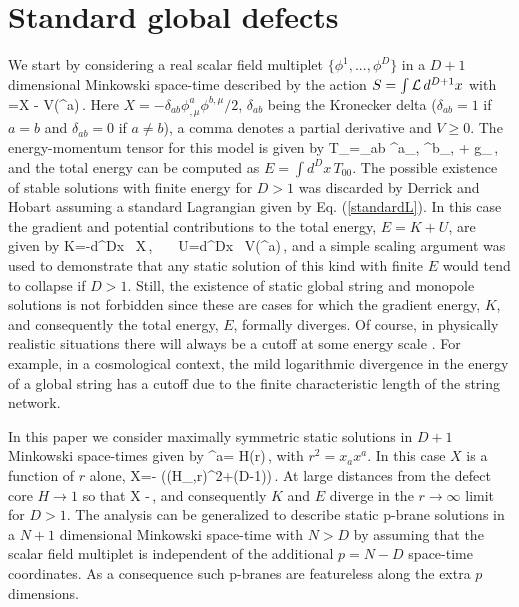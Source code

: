 \documentclass[prd,twocolumn,a4paper,superscriptaddress,floatfix]{revtex4}
\begin{document}
\section{Standard global defects}

We start by considering a real scalar field multiplet $\{\phi^1, ..., \phi^D\}$ in a $D+1$ dimensional Minkowski space-time described by the action $S=\int {\cal L} \, d^{D+1}x$ with
\be
\label{standardL}
\LL =X - V(\phi^a)\,.
\ee
Here $X=-\delta_{ab} \phi^a_{,\mu} \phi^{b,\mu}/2$, $\delta_{ab}$ being the Kronecker delta ($\delta_{ab}=1$ if $a=b$ and $\delta_{ab}=0$ if $a \neq b$), a comma denotes a partial derivative and $V \ge 0$. The energy-momentum tensor for this model is given by
\be
T_{\mu\nu}=\delta_{ab} \phi^a_{,\mu} \phi^b_{,\nu} + g_{\mu\nu}\LL\,,
\ee
and the total energy can be computed as $E=\int d^D x\, T_{00}$. The possible existence of stable solutions with finite energy for $D > 1$ was discarded by Derrick and Hobart \cite{0370-1328-82-2-306,1964JMP.....5.1252D} assuming a standard Lagrangian given by Eq. (\ref{standardL}). In this case the gradient and potential contributions to the total energy, $E=K+U$, are given by
\be\label{EGandEV}
K=-\int d^Dx  \, X\,, \, \,\,\,\, U=\int d^Dx \, V(\phi^a)\,,
\ee
and a simple scaling argument was used to demonstrate that any static solution of this kind with finite $E$ would tend to collapse if $D>1$. Still, the existence of static global string and monopole solutions is not forbidden since these are cases for which the gradient energy, $K$, and consequently the total energy, $E$,  formally diverges. Of course, in physically realistic situations there will always be a cutoff at some energy scale \cite{1992NuPhB.375..665P}. For example, in a cosmological context, the mild logarithmic divergence in the energy of a global string has a cutoff due to the finite characteristic length of the string network.

In this paper we consider maximally symmetric static solutions in $D+1$ Minkowski space-times 
given by
\be
\label{ans}
\phi^a= H(r)\,,
\ee 
with $r^2=x_a x^a$. In this case $X$ is a function of $r$ alone,
\be
X=- \left((H_{,r})^2+(D-1)\right)\,.
\ee
At large distances from the defect core $H \to 1$ so that
\be
X \to -\,,
\ee
and consequently $K$ and $E$ diverge in the $r \to \infty$ limit for $D > 1$. The analysis can be generalized to describe static p-brane solutions in a $N+1$ dimensional Minkowski space-time with $N > D$ by assuming that the scalar field multiplet is independent of the additional $p=N-D$ space-time coordinates. As a consequence such p-branes are featureless along the extra $p$ dimensions.
\end{document}
